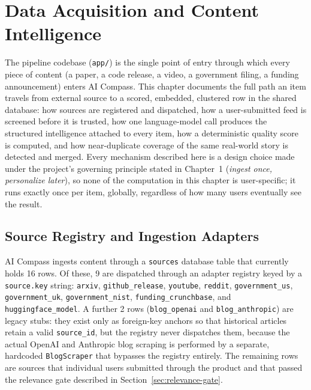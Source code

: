 \chapter{Data Acquisition and Content Intelligence}
\label{ch:data-pipeline}

The pipeline codebase (\texttt{app/}) is the single point of entry through which every piece of content (a paper, a code release, a video, a government filing, a funding announcement) enters AI Compass. This chapter documents the full path an item travels from external source to a scored, embedded, clustered row in the shared database: how sources are registered and dispatched, how a user-submitted feed is screened before it is trusted, how one language-model call produces the structured intelligence attached to every item, how a deterministic quality score is computed, and how near-duplicate coverage of the same real-world story is detected and merged. Every mechanism described here is a design choice made under the project's governing principle stated in Chapter~1 (\emph{ingest once, personalize later}), so none of the computation in this chapter is user-specific; it runs exactly once per item, globally, regardless of how many users eventually see the result.

\section{Source Registry and Ingestion Adapters}
\label{sec:source-registry}

AI Compass ingests content through a \texttt{sources} database table that currently holds 16 rows. Of these, 9 are dispatched through an adapter registry keyed by a \texttt{source.key} string: \texttt{arxiv}, \texttt{github\_release}, \texttt{youtube}, \texttt{reddit}, \texttt{government\_us}, \texttt{government\_uk}, \texttt{government\_nist}, \texttt{funding\_crunchbase}, and \texttt{huggingface\_model}. A further 2 rows (\texttt{blog\_openai} and \texttt{blog\_anthropic}) are legacy stubs: they exist only as foreign-key anchors so that historical articles retain a valid \texttt{source\_id}, but the registry never dispatches them, because the actual OpenAI and Anthropic blog scraping is performed by a separate, hardcoded \texttt{BlogScraper} that bypasses the registry entirely. The remaining rows are sources that individual users submitted through the product and that passed the relevance gate described in Section~\ref{sec:relevance-gate}.


